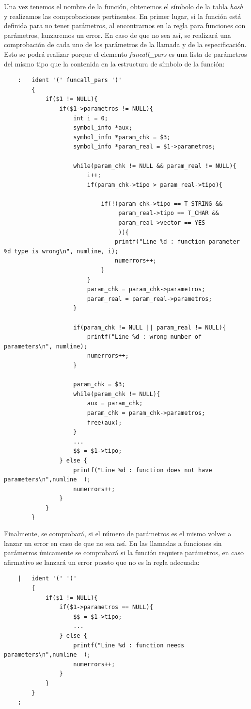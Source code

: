 \documentclass[a4paper,10pt]{article}
\begin{document}
Una vez tenemos el nombre de la función, obtenemos el símbolo de la tabla \textit{hash} y realizamos las comprobaciones pertinentes. En primer lugar, si la función está definida para no tener parámetros, al encontrarnos en la regla para funciones con parámetros, lanzaremos un error. En caso de que no sea así, se realizará una comprobación de cada uno de los parámetros de la llamada y de la especificación. Esto se podrá realizar porque el elemento \textit{funcall\_pars} es una lista de parámetros del mismo tipo que la contenida en la estructura de símbolo de la función:

\begin{lstlisting}
	:	ident '(' funcall_pars ')'
		{
			if($1 != NULL){
				if($1->parametros != NULL){
					int i = 0;
					symbol_info *aux;
					symbol_info *param_chk = $3;
					symbol_info *param_real = $1->parametros;

					while(param_chk != NULL && param_real != NULL){
						i++;
						if(param_chk->tipo > param_real->tipo){
							
							if(!(param_chk->tipo == T_STRING && 
								 param_real->tipo == T_CHAR && 
								 param_real->vector == YES
								 )){
								printf("Line %d : function parameter %d type is wrong\n", numline, i);
								numerrors++;
							}
						}
						param_chk = param_chk->parametros;
						param_real = param_real->parametros;
					}

					if(param_chk != NULL || param_real != NULL){
						printf("Line %d : wrong number of parameters\n", numline);
						numerrors++;
					}

					param_chk = $3;
					while(param_chk != NULL){
						aux = param_chk;
						param_chk = param_chk->parametros;
						free(aux);
					}
					...
					$$ = $1->tipo;
				} else {
					printf("Line %d : function does not have parameters\n",numline  );
					numerrors++;
				}
			}
		}
\end{lstlisting}
Finalmente, se comprobará, si el número de parámetros es el mismo volver a lanzar un error en caso de que no sea así. En las llamadas a funciones sin parámetros únicamente se comprobará si la función requiere parámetros, en caso afirmativo se lanzará un error puesto que no es la regla adecuada:

\begin{lstlisting}
	|	ident '(' ')' 
		{
			if($1 != NULL){
				if($1->parametros == NULL){
					$$ = $1->tipo;
					...
				} else {
					printf("Line %d : function needs parameters\n",numline  );
					numerrors++;
				}
			}
		}
	;
\end{lstlisting}
\end{document}

